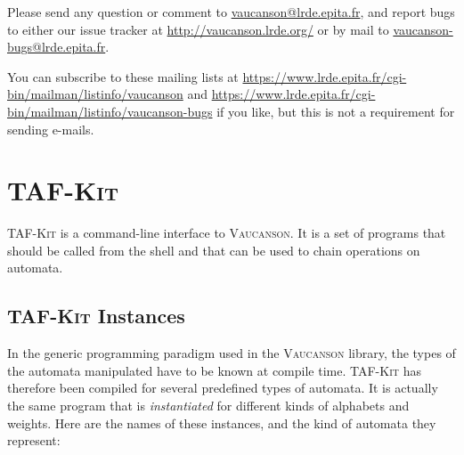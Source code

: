 \documentclass[a4paper]{report}
\newcommand{\tafkit}{\textsc{TAF-Kit}\xspace}
\newcommand{\Vauc}{\textsc{Vaucanson}\xspace}
\begin{document}
Please send any question or comment to \url{vaucanson@lrde.epita.fr},
and report bugs to either our issue tracker at
\url{http://vaucanson.lrde.org/} or by mail to
\url{vaucanson-bugs@lrde.epita.fr}.

You can subscribe to these mailing lists at
\url{https://www.lrde.epita.fr/cgi-bin/mailman/listinfo/vaucanson} and
\url{https://www.lrde.epita.fr/cgi-bin/mailman/listinfo/vaucanson-bugs}
if you like, but this is not a requirement for sending e-mails.

\chapter{\tafkit}
\label{sec:tafkit}

\tafkit is a command-line interface to \Vauc.  It is a set of programs
that should be called from the shell and that can be used to chain
operations on automata.

\section{\tafkit Instances}

In the generic programming paradigm used in the \Vauc library, the
types of the automata manipulated have to be known at compile time.
\tafkit has therefore been compiled for several predefined types of
automata.  It is actually the same program that is \emph{instantiated}
for different kinds of alphabets and weights.  Here are the names of
these instances, and the kind of automata they represent:
\end{document}
